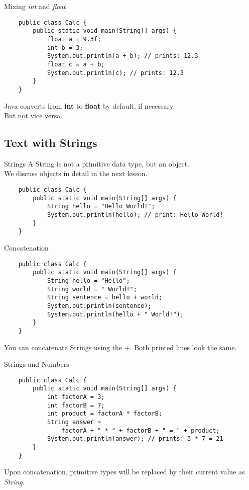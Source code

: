 \begin{frame}[fragile]{Mixing \emph{int} and \emph{float}}
    \begin{lstlisting}
    public class Calc {
        public static void main(String[] args) {
            float a = 9.3f;
            int b = 3;
            System.out.println(a + b); // prints: 12.3
            float c = a + b;
            System.out.println(c); // prints: 12.3
        }
    }\end{lstlisting}
    Java converts from \textbf{int} to \textbf{float} by default, if necessary. \\
    But not vice versa.
\end{frame}

\subsection{Text with Strings}

\begin{frame}[fragile]{Strings}
    A String is not a primitive data type, but an object. \\
    We discuss objects in detail in the next lesson.
    \begin{lstlisting}
    public class Calc {
        public static void main(String[] args) {
            String hello = "Hello World!";
            System.out.println(hello); // print: Hello World!
        }
    }\end{lstlisting}
\end{frame}

\begin{frame}[fragile]{Concatenation}
    \begin{lstlisting}
    public class Calc {
        public static void main(String[] args) {
            String hello = "Hello";
            String world = " World!";
            String sentence = hello + world;
            System.out.println(sentence);
            System.out.println(hello + " World!");
        }
    }\end{lstlisting}
    You can concatenate Strings using the +. Both printed lines look the same.
\end{frame}

\begin{frame}[fragile]{Strings and Numbers}
    \begin{lstlisting}
    public class Calc {
        public static void main(String[] args) {
            int factorA = 3;
            int factorB = 7;
            int product = factorA * factorB;
            String answer =
                factorA + " * " + factorB + " = " + product;
            System.out.println(answer); // prints: 3 * 7 = 21
        }
    }\end{lstlisting}
    Upon concatenation, primitive types will be replaced by their current value as \emph{String}.
\end{frame}

